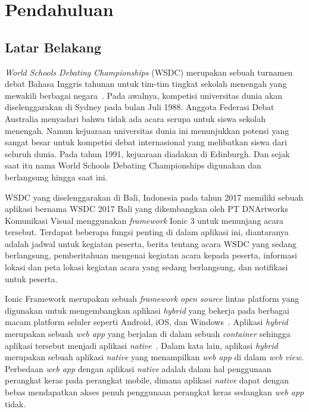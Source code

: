 \chapter{Pendahuluan}
\label{chap:intro}
   
\section{Latar Belakang}
\label{sec:label}

\textit{World Schools Debating Championships} (WSDC) merupakan sebuah turnamen debat Bahasa Inggris tahunan untuk tim-tim tingkat sekolah menengah yang mewakili berbagai negara~\cite{wsdc}. Pada awalnya, kompetisi universitas dunia akan diselenggarakan di Sydney pada bulan Juli 1988. Anggota Federasi Debat Australia menyadari bahwa tidak ada acara serupa untuk siswa sekolah menengah. Namun kejuaraan universitas dunia ini menunjukkan potensi yang sangat besar untuk kompetisi debat internasional yang melibatkan siswa dari seluruh dunia. Pada tahun 1991, kejuaraan diadakan di Edinburgh. Dan sejak saat itu nama World Schools Debating Championships digunakan dan berlangsung hingga saat ini. 

WSDC yang diselenggarakan di Bali, Indonesia pada tahun 2017 memiliki sebuah aplikasi bernama WSDC 2017 Bali yang dikembangkan oleh PT DNArtworks Komunikasi Visual menggunakan \textit{framework} Ionic 3 untuk menunjang acara tersebut. Terdapat beberapa fungsi penting di dalam aplikasi ini, diantaranya adalah jadwal untuk kegiatan peserta, berita tentang acara WSDC yang sedang berlangsung, pemberitahuan mengenai kegiatan acara kepada peserta, informasi lokasi dan peta lokasi kegiatan acara yang sedang berlangsung, dan notifikasi untuk peserta. 

Ionic Framework merupakan sebuah {\it framework open source} lintas platform yang digunakan untuk mengembangkan aplikasi \textit{hybrid} yang bekerja pada berbagai macam platform seluler seperti Android, iOS, dan Windows~\cite{waranashiwar:18:ionic}. Aplikasi \textit{hybrid} merupakan sebuah \textit{web app} yang berjalan di dalam sebuah \textit{container} sehingga aplikasi tersebut menjadi aplikasi \textit{native}~\cite{yusuf:16:ionic}. Dalam kata lain, aplikasi \textit{hybrid} merupakan sebuah aplikasi \textit{native} yang menampilkan \textit{web app} di dalam \textit{web view}. Perbedaan \textit{web app} dengan aplikasi \textit{native} adalah dalam hal penggunaan perangkat keras pada perangkat mobile, dimana aplikasi \textit{native} dapat dengan bebas mendapatkan akses penuh penggunaan perangkat keras sedangkan \textit{web app} tidak.

